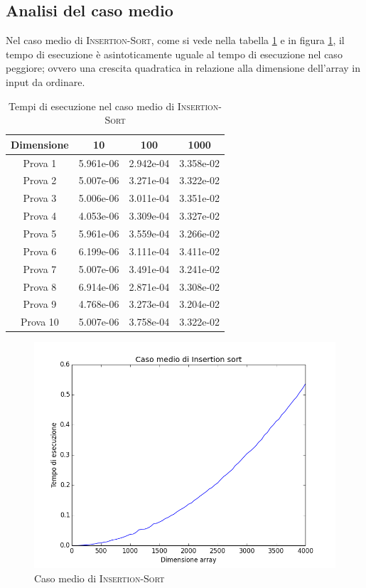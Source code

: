 \documentclass[11pt]{article}
\begin{document}
\subsection{Analisi del caso medio}
Nel caso medio di \textsc{Insertion-Sort}, come si vede nella tabella \ref{t_medio_insertion} e in figura \ref{medio_insertion}, il tempo di esecuzione è asintoticamente uguale al tempo di esecuzione nel caso peggiore; ovvero una crescita quadratica in relazione alla dimensione dell'array in input da ordinare.
\begin{table}[h]
\centering
\begin{tabular}{|c|c|c|c|}\hline
Dimensione &10 &100 &1000\\ \hline
Prova 1	&5.961e-06	&2.942e-04 &3.358e-02 \\ \hline
Prova 2	&5.007e-06	&3.271e-04	&3.322e-02 \\ \hline
Prova 3	&5.006e-06 &3.011e-04	&3.351e-02 \\ \hline
Prova 4	&4.053e-06	&3.309e-04	&3.327e-02	 \\ \hline
Prova 5	&5.961e-06	&3.559e-04	&3.266e-02 \\ \hline
Prova 6	&6.199e-06	&3.111e-04	&3.411e-02  \\ \hline
Prova 7	&5.007e-06	&3.491e-04	&3.241e-02  \\ \hline
Prova 8	&6.914e-06	&2.871e-04	&3.308e-02	 \\ \hline
Prova 9	&4.768e-06	&3.273e-04	&3.204e-02	 \\ \hline
Prova 10&5.007e-06 &3.758e-04	&3.322e-02	\\ \hline
\end{tabular}
\caption{Tempi di esecuzione nel caso medio di \textsc{Insertion-Sort}}
\label{t_medio_insertion}
\end{table}
\begin{figure}[h]
\centering
\includegraphics[scale=0.33,angle=0]{medio_insertion.png}
\caption{Caso medio di \textsc{Insertion-Sort}}
\label{medio_insertion}
\end{figure}\\
\end{document}
